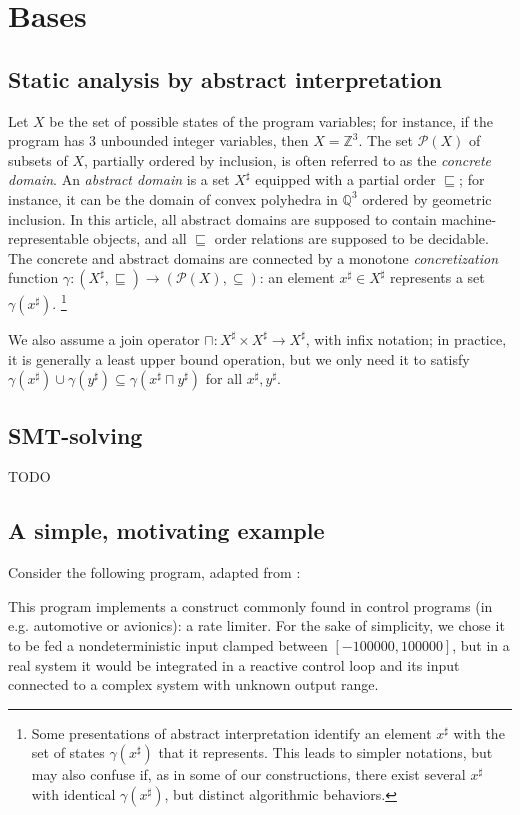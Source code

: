 \documentclass[preprint]{sigplanconf}
\newcommand{\abstr}[1]{#1^\sharp}
\newcommand{\parts}[1]{\mathscr{P}(#1)}
\newcommand{\ZZ}{\mathbb{Z}}
\newcommand{\QQ}{\mathbb{Q}}
\begin{document}
\section{Bases}
\subsection{Static analysis by abstract interpretation}
Let $X$ be the set of possible states of the program variables; for instance, if the program has 3 unbounded integer variables, then $X = \ZZ^3$. The set $\parts{X}$ of subsets of $X$, partially ordered by inclusion, is often referred to as the \emph{concrete domain}. An \emph{abstract domain} is a set $\abstr{X}$ equipped with a partial order $\sqsubseteq$; for instance, it can be the domain of convex polyhedra in $\QQ^3$ ordered by geometric inclusion. In this article, all abstract domains are supposed to contain machine-representable objects, and all $\sqsubseteq$ order relations are supposed to be decidable.
The concrete and abstract domains are connected by a monotone \emph{concretization} function $\gamma: \left(\abstr{X},\sqsubseteq\right) \rightarrow (\parts{X},\subseteq)$: an element $\abstr{x} \in \abstr{X}$ represents a set $\gamma(\abstr{x})$.%
%
\footnote{%
Some presentations of abstract interpretation identify an element $\abstr{x}$ with the set of states $\gamma(\abstr{x})$ that it represents. This leads to simpler notations, but may also confuse if, as in some of our constructions, there exist several $\abstr{x}$ with identical $\gamma(\abstr{x})$, but distinct algorithmic behaviors.}

We also assume a join operator $\sqcap: \abstr{X} \times \abstr{X} \rightarrow \abstr{X}$, with infix notation; in practice, it is generally a least upper bound operation, but we only need it to satisfy $\gamma(\abstr{x}) \cup \gamma(\abstr{y}) \subseteq \gamma(\abstr{x} \sqcap \abstr{y})$ for all $\abstr{x},\abstr{y}$.

\subsection{SMT-solving}
TODO

\subsection{A simple, motivating example}
\label{subsec:rate_lim}
Consider the following program, adapted from \cite{Monniaux_Gonnord_SAS11}:

This program implements a construct commonly found in control programs (in e.g. automotive or avionics): a rate limiter. For the sake of simplicity, we chose it to be fed a nondeterministic input clamped between $[-100000,100000]$, but in a real system it would be integrated in a reactive control loop and its input connected to a complex system with unknown output range.
\end{document}
